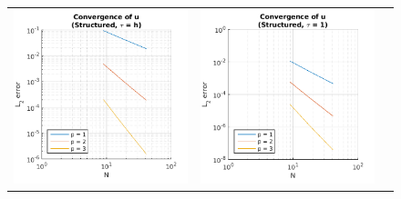 \documentclass{article}
\begin{document}
\begin{figure}
\centering
\begin{tabular}{c c c}
\includegraphics[scale=0.5]{cs_1.png} & 
\includegraphics[scale=0.5]{cs_2.png} & 

\end{tabular}
\end{figure}
\end{document}
